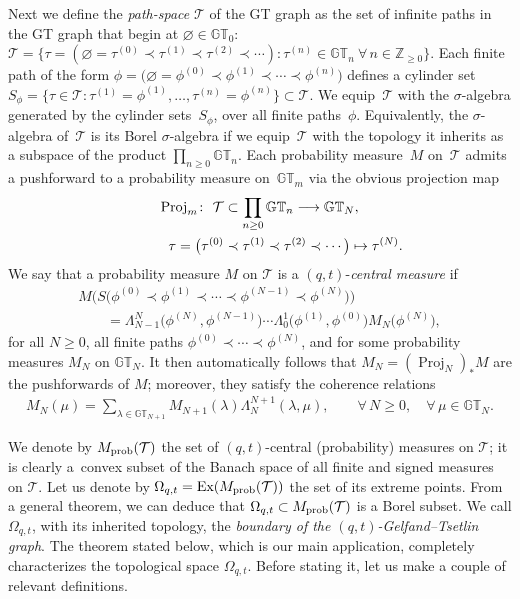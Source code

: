 \documentclass[pdftex]{sigma}
\numberwithin{equation}{section}
\newcommand{\Z}{\mathbb{Z}}
\newcommand{\GT}{\mathbb{GT}}
\newcommand{\Tau}{\mathcal{T}}
\begin{document}
Next we def\/ine the \textit{path-space} $\Tau$ of the GT graph as the set of inf\/inite paths in the GT graph that begin at $\varnothing\in\GT_0$: $\Tau = \{\tau = (\varnothing = \tau^{(0)} \prec \tau^{(1)} \prec \tau^{(2)} \prec \cdots) \colon \tau^{(n)}\in\GT_n \ \forall\, n\in\Z_{\geq 0}\}$. Each f\/inite path of the form $\phi = \big(\varnothing = \phi^{(0)} \prec \phi^{(1)} \prec \cdots \prec \phi^{(n)}\big)$ def\/ines a cylinder set $S_{\phi} = \big\{\tau\in\Tau \colon \tau^{(1)} = \phi^{(1)}, \dots, \tau^{(n)} = \phi^{(n)}\big\} \subset \Tau$. We equip~$\Tau$ with the $\sigma$-algebra generated by the cylinder sets~$S_{\phi}$, over all f\/inite paths~$\phi$.
Equivalently, the $\sigma$-algebra of~$\Tau$ is its Borel $\sigma$-algebra if we equip~$\Tau$ with the topology it inherits as a subspace of the product $\prod\limits_{n\geq 0}{\GT_n}$. Each probability measure~$M$ on~$\Tau$ admits a pushforward to a probability measure on~$\GT_m$ via the obvious projection map
\begin{gather*}
\operatorname{Proj}_m\colon \ \Tau\subset\prod_{n\geq 0}{\GT_n} \longrightarrow \GT_N,\\
\hphantom{\operatorname{Proj}_m\colon}{} \ \tau = \big(\tau^{(0)}\prec \tau^{(1)}\prec \tau^{(2)} \prec \cdots\big) \mapsto \tau^{(N)}.
\end{gather*}
We say that a probability measure $M$ on $\Tau$ is a $(q, t)$-\textit{central measure} if
\begin{gather*}
M\big( S\big(\phi^{(0)} \prec \phi^{(1)} \prec \cdots\prec \phi^{(N-1)} \prec \phi^{(N)}\big) \big)\\
\qquad{} =
\Lambda^{N}_{N-1}\big(\phi^{(N)}, \phi^{(N-1)}\big) \cdots \Lambda^{1}_0\big(\phi^{(1)}, \phi^{(0)}\big) M_N\big(\phi^{(N)}\big),
\end{gather*}
for all $N \geq 0$, all f\/inite paths $\phi^{(0)} \prec \cdots \prec \phi^{(N)}$, and for some probability measures $M_N$ on $\GT_N$.
It then automatically follows that $M_N = (\operatorname{Proj}_N)_*M$ are the pushforwards of $M$; moreover, they satisfy the coherence relations
\begin{gather*}
M_N(\mu) = \sum_{\lambda\in\GT_{N+1}}{M_{N+1}(\lambda)\Lambda^{N+1}_N(\lambda, \mu)}, \qquad \forall\, N \geq 0, \quad \forall\, \mu\in\GT_N.
\end{gather*}

We denote by $M_{\rm prob}(\Tau)$ the set of $(q, t)$-central (probability) measures on $\Tau$; it is clearly a~convex subset of the Banach space of all f\/inite and signed measures on $\Tau$. Let us denote by $\Omega_{q, t} = \textrm{Ex}(M_{\rm prob}(\Tau))$ the set of its extreme points. From a general theorem, we can deduce that $\Omega_{q, t} \subset M_{\rm prob}(\Tau)$ is a Borel subset. We call $\Omega_{q, t}$, with its inherited topology, the \textit{boundary of the $(q, t)$-Gelfand--Tsetlin graph}. The theorem stated below, which is our main application, completely characterizes the topological space $\Omega_{q, t}$. Before stating it, let us make a couple of relevant def\/initions.
\end{document}
